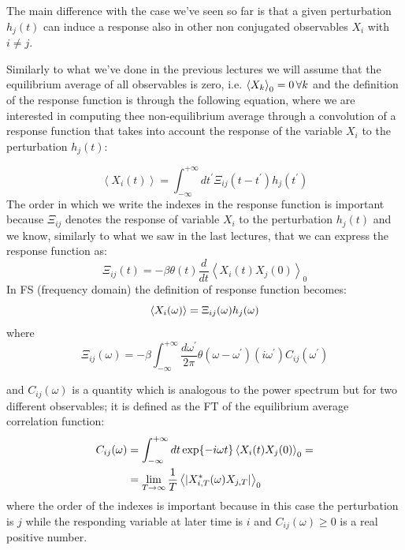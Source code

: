 \documentclass[\main/main.tex]{subfiles}
\begin{document}
The main difference with the case we've seen so far is that a given perturbation $h_j(t)$ can induce a response also in other non conjugated observables $X_i$ with $i\neq j$.

Similarly to what we've done in the previous lectures we will assume that the equilibrium average of all observables is zero, i.e. $\left\langle X_k \right\rangle_0 = 0\,\forall k$ and the definition of the response function is through the following equation, where we are interested in computing thee non-equilibrium average through a convolution of a response function that takes into account the response of the variable $X_i$ to the perturbation $h_j(t)$:

\begin{equation}
    \left\langle X_{i}(t)\right\rangle=\int_{-\infty}^{+\infty} d t^{\prime} \Xi_{i j}\left(t-t^{\prime}\right) h_{j}\left(t^{\prime}\right)
\end{equation}
The order in which we write the indexes in the response function is important because $\Xi_{ij}$ denotes the response of variable $X_i$ to the perturbation $h_j(t)$ and we know, similarly to what we saw in the last lectures, that we can express the response function as:
\begin{equation}
    \Xi_{i j}(t)=-\beta \theta(t) \frac{d}{d t}\left\langle X_{i}(t) X_{j}(0)\right\rangle_{0}
\end{equation}
In FS (frequency domain) the definition of response function becomes:
\begin{equation}
    \left\langle X_i(\omega) \right\rangle=\Xi_{ij}(\omega)h_j(\omega)
\end{equation}
where 
\begin{equation}
    \Xi_{i j}(\omega)=-\beta \int_{-\infty}^{+\infty} \frac{d \omega^{\prime}}{2 \pi} \theta\left(\omega-\omega^{\prime}\right)\left(i \omega^{\prime}\right) C_{i j}\left(\omega^{\prime}\right)
\end{equation}

and $C_{ij}(\omega)$ is a quantity which is analogous to the power spectrum but for two different observables; it is defined as the FT of the equilibrium average correlation function:
\begin{align}
    C_{ij}(\omega)&=\int_{-\infty}^{+\infty} dt \exp{-i\omega t}\left\langle X_i(t)X_j(0) \right\rangle_0 = \\
    &=\lim_{T\to\infty}\frac{1}{T}\left\langle |X_{i,T}^*(\omega)X_{j,T}| \right\rangle_0
\end{align}
where the order of the indexes is important because in this case the perturbation is $j$ while the responding variable at later time is $i$ and $C_{ij}(\omega)\geq 0$ is a real positive number. \\
\end{document}
